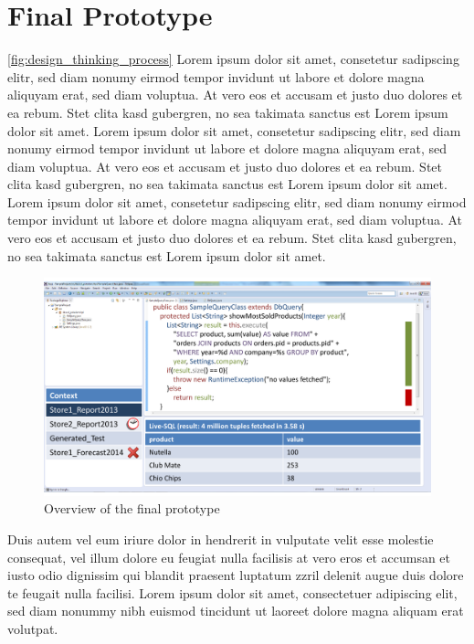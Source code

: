 
\section{Final Prototype}
\label{sec:FINAL_PROTOTYPE}
\ref{fig:design_thinking_process}
Lorem ipsum dolor sit amet, consetetur sadipscing elitr, sed diam nonumy eirmod tempor invidunt ut labore et dolore magna aliquyam erat, sed diam voluptua. At vero eos et accusam et justo duo dolores et ea rebum. Stet clita kasd gubergren, no sea takimata sanctus est Lorem ipsum dolor sit amet. Lorem ipsum dolor sit amet, consetetur sadipscing elitr, sed diam nonumy eirmod tempor invidunt ut labore et dolore magna aliquyam erat, sed diam voluptua. At vero eos et accusam et justo duo dolores et ea rebum. Stet clita kasd gubergren, no sea takimata sanctus est Lorem ipsum dolor sit amet. Lorem ipsum dolor sit amet, consetetur sadipscing elitr, sed diam nonumy eirmod tempor invidunt ut labore et dolore magna aliquyam erat, sed diam voluptua. At vero eos et accusam et justo duo dolores et ea rebum. Stet clita kasd gubergren, no sea takimata sanctus est Lorem ipsum dolor sit amet.   
\begin{figure}
\begin{centering}
    \includegraphics[width=1.0\linewidth]{images/final_prototype}
    \caption{Overview of the final prototype}
    \label{fig:final_prototype_overview}
\end{centering}
\end{figure}
Duis autem vel eum iriure dolor in hendrerit in vulputate velit esse molestie consequat, vel illum dolore eu feugiat nulla facilisis at vero eros et accumsan et iusto odio dignissim qui blandit praesent luptatum zzril delenit augue duis dolore te feugait nulla facilisi. Lorem ipsum dolor sit amet, consectetuer adipiscing elit, sed diam nonummy nibh euismod tincidunt ut laoreet dolore magna aliquam erat volutpat.   

